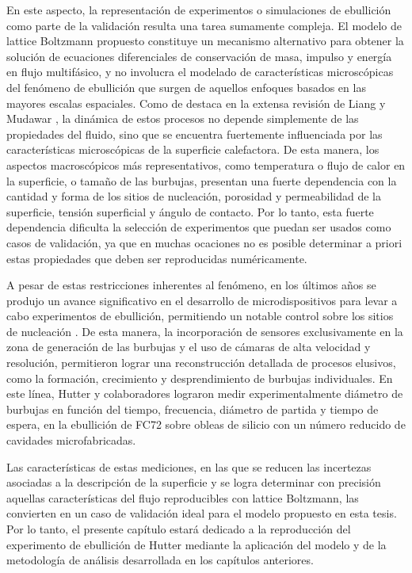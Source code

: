 En este aspecto, la representaci\'on de experimentos o simulaciones de ebullici\'on como parte de la validaci\'on resulta una tarea sumamente compleja. El modelo de lattice Boltzmann propuesto constituye un mecanismo alternativo para obtener la soluci\'on de ecuaciones diferenciales de conservaci\'on de masa, impulso y energ\'ia en flujo multif\'asico, y no involucra el modelado de caracter\'isticas microsc\'opicas del fen\'omeno de ebullici\'on que surgen de aquellos enfoques basados en las mayores escalas espaciales. Como de destaca en la extensa revisi\'on de Liang y Mudawar \cite{liang_review_2019}, la din\'amica de estos procesos no depende simplemente de las propiedades del fluido, sino que se encuentra fuertemente influenciada por las caracter\'isticas microsc\'opicas de la superficie calefactora. De esta manera, los aspectos macrosc\'opicos m\'as representativos, como temperatura o flujo de calor en la superficie, o tama\~no de las burbujas, presentan una fuerte dependencia con la cantidad y forma de los sitios de nucleaci\'on, porosidad y permeabilidad de la superficie, tensi\'on superficial y \'angulo de contacto. Por lo tanto, esta fuerte dependencia dificulta la selecci\'on de experimentos que puedan ser usados como casos de validaci\'on, ya que en muchas ocaciones no es posible determinar a priori estas propiedades que deben ser reproducidas num\'ericamente.

A pesar de estas restricciones inherentes al fen\'omeno, en los \'ultimos a\~nos se produjo un avance significativo en el desarrollo de microdispositivos para levar a cabo experimentos de ebullici\'on, permitiendo un notable control sobre los sitios de nucleaci\'on \cite{gregorcic_scalable_2018, liu_experimental_2019}. De esta manera, la incorporaci\'on de sensores exclusivamente en la zona de generaci\'on de las burbujas y el uso de c\'amaras de alta velocidad y resoluci\'on, permitieron lograr una reconstrucci\'on detallada de procesos elusivos, como la formaci\'on, crecimiento y desprendimiento de burbujas individuales. En este l\'inea, Hutter y colaboradores \cite{hutter_experimental_2009,hutter_experimental_2010} lograron medir experimentalmente di\'ametro de burbujas en funci\'on del tiempo, frecuencia, di\'ametro de partida y tiempo de espera, en la ebullici\'on de FC72 sobre obleas de silicio con un n\'umero reducido de cavidades microfabricadas. 

Las caracter\'isticas de estas mediciones, en las que se reducen las incertezas asociadas a la descripci\'on de la superficie y se logra determinar con precisi\'on aquellas caracter\'isticas del flujo reproducibles con lattice Boltzmann, las convierten en un caso de validaci\'on ideal para el modelo propuesto en esta tesis. Por lo tanto, el presente cap\'itulo estar\'a dedicado a la reproducci\'on del experimento de ebullici\'on de Hutter mediante la aplicaci\'on del modelo y de la metodolog\'ia de an\'alisis desarrollada en los cap\'itulos anteriores.

